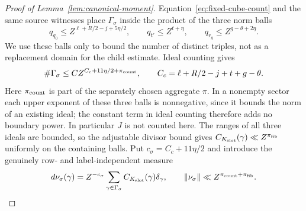 \documentclass[11pt,a4paper]{article}
\numberwithin{equation}{section}
\numberwithin{figure}{section}
\theoremstyle{definition}
\theoremstyle{remark}
\begin{document}
\begin{proof}[Proof of Lemma~\ref{lem:canonical-moment}]
Equation~\eqref{eq:fixed-cube-count} and the same source witnesses
place \(\Gamma_\sigma\) inside the product of the three norm balls
\[
 q_{q_0}\le Z^{\ell+R/2-j+5\eta/2},\qquad
 q_{t'}\le Z^{t+\eta},\qquad q_{r_g}\le Z^{g-\theta+2\eta}.
\]
We use these balls only to bound the number of distinct triples, not
as a replacement domain for the child estimate.  Ideal counting gives
\begin{equation}\label{eq:canonical-fixed-count}
 \#\Gamma_\sigma\le C Z^{C_c+11\eta/2+\pi_{\rm count}},\qquad
 C_c=\ell+R/2-j+t+g-\theta.
\end{equation}
Here \(\pi_{\rm count}\) is part of the separately chosen aggregate
\(\pi\).  In a nonempty sector each upper exponent of these three
balls is nonnegative, since it bounds the norm of an existing ideal;
the constant term in ideal counting therefore adds no boundary power.
In particular \(J\) is not counted here.  The ranges of all three
ideals are bounded, so the adjustable divisor bound gives
\(C_{K_{\rm slot}}(\gamma)\ll Z^{\pi_{\rm fib}}\) uniformly on
the containing balls.  Put \(c_\sigma=C_c+11\eta/2\) and introduce
the genuinely row- and label-independent measure
\begin{equation}\label{eq:inverse-normalized-triples}
 d\nu_\sigma(\gamma)=Z^{-c_\sigma}
 \sum_{\gamma\in\Gamma_\sigma}C_{K_{\rm slot}}(\gamma)\delta_\gamma,
 \qquad \|\nu_\sigma\|\ll Z^{\pi_{\rm count}+\pi_{\rm fib}}.
\end{equation}


\end{proof}
\end{document}
